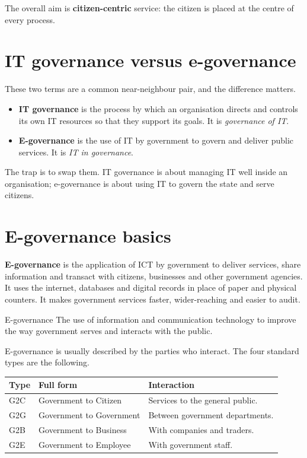 The overall aim is \textbf{citizen-centric} service: the citizen is placed at
the centre of every process.

\section{IT governance versus e-governance}
These two terms are a common near-neighbour pair, and the difference matters.

\begin{itemize}
  \item \textbf{IT governance} is the process by which an organisation
    directs and controls its own IT resources so that they support its goals.
    It is \emph{governance of IT}.
  \item \textbf{E-governance} is the use of IT by government to govern and
    deliver public services. It is \emph{IT in governance}.
\end{itemize}

The trap is to swap them. IT governance is about managing IT well inside an
organisation; e-governance is about using IT to govern the state and serve
citizens.

\section{E-governance basics}
\textbf{E-governance} is the application of ICT by government to deliver
services, share information and transact with citizens, businesses and other
government agencies. It uses the internet, databases and digital records in
place of paper and physical counters. It makes government services faster,
wider-reaching and easier to audit.

\begin{definitionbox}{E-governance}
The use of information and communication technology to improve the way
government serves and interacts with the public.
\end{definitionbox}

E-governance is usually described by the parties who interact. The four
standard types are the following.

\begin{center}
\begin{tabular}{p{}p{}p{}}
\toprule
\textbf{Type} & \textbf{Full form} & \textbf{Interaction} \\
\midrule
G2C & Government to Citizen & Services to the general public. \\
G2G & Government to Government & Between government departments. \\
G2B & Government to Business & With companies and traders. \\
G2E & Government to Employee & With government staff. \\
\bottomrule
\end{tabular}
\end{center}

